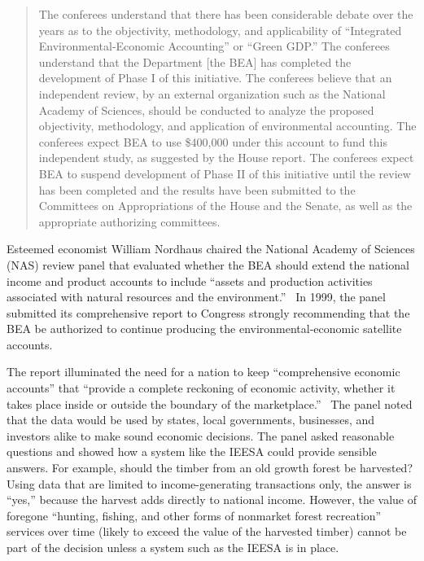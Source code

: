 \begin{quote}
	The conferees understand that there has been considerable debate 
	over the years as to the objectivity, methodology, and applicability 
	of ``Integrated Environmental-Economic Accounting'' or ``Green GDP.''
	The conferees understand that the Department [the BEA]
	has completed the development of Phase I of this initiative. 
	The conferees believe that an independent review, 
	by an external organization such as the National Academy of Sciences, 
	should be conducted to analyze 
	the proposed objectivity, methodology, and application of environmental accounting. 
	The conferees expect BEA to use \$400,000 under this account 
	to fund this independent study, as suggested by the House report. 
	The conferees expect BEA to suspend development 
	of Phase II of this initiative 
	until the review has been completed and the results have been submitted 
	to the Committees on Appropriations of the House and the Senate, 
	as well as the appropriate authorizing committees.\cite{HR103708}
\end{quote}

Esteemed economist William Nordhaus chaired the 
National Academy of Sciences (NAS) review panel
that evaluated whether the BEA should extend 
the national income and product accounts to include 
``assets and production activities associated 
with natural resources and the environment.''~\cite[p.~2]{Nordhaus1999a} 
In 1999, the panel submitted its comprehensive report 
to Congress strongly recommending that the BEA be authorized 
to continue producing the environmental-economic satellite accounts.\cite{Nordhaus1999a}

The report illuminated the need for a nation 
to keep ``comprehensive economic accounts'' that 
``provide a complete reckoning of economic activity, 
whether it takes place inside or outside 
the boundary of the marketplace.''~\cite[p.~29]{Nordhaus1999a}
The panel noted that the data would be used 
by states, local governments, businesses, and investors alike 
to make sound economic decisions. 
The panel asked reasonable questions and showed how a system like the IEESA
could provide sensible answers.
For example, should the timber from an old growth forest be harvested? 
Using data that are limited to income-generating transactions only, 
the answer is ``yes,''
because the harvest adds directly to national income. 
However, the value of foregone ``hunting, fishing, 
and other forms of nonmarket forest recreation'' 
services over time (likely to exceed the value of the harvested timber)
cannot be part of the decision unless 
a system such as the IEESA is in place.\cite[p.~30]{Nordhaus1999a}

